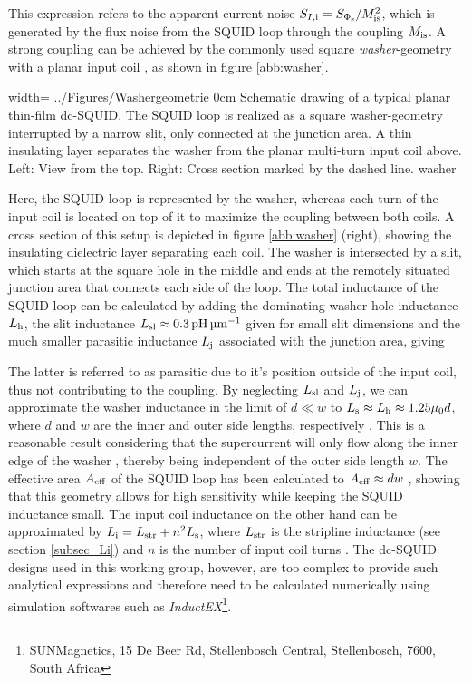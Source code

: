 
This expression refers to the apparent current noise $S_{I\rm ,i}=S_{\rm \Phi_s}/M_{\rm is}^2$, which is generated by the flux noise from the SQUID loop through the coupling $M_{\rm is}$. A strong coupling can be achieved by the commonly used square \textit{washer}-geometry with a planar input coil \cite{Jaycox1981}, as shown in figure \ref{abb:washer}. 

{width=\textwidth}
{../Figures/Washergeometrie}
{0cm}   %
{Schematic drawing of a typical planar thin-film dc-SQUID. The SQUID loop is realized as a square washer-geometry interrupted by a narrow slit, only connected at the junction area. A thin insulating layer separates the washer from the planar multi-turn input coil above. Left: View from the top. Right: Cross section marked by the dashed line.}
{washer}

Here, the SQUID loop is represented by the washer, whereas each turn of the input coil is located on top of it to maximize the coupling between both coils. A cross section of this setup is depicted in figure \ref{abb:washer} (right), showing the insulating dielectric layer separating each coil. The washer is intersected by a slit, which starts at the square hole in the middle and ends at the remotely situated junction area that connects each side of the loop. The total inductance of the SQUID loop can be calculated by adding the dominating washer hole inductance $L_{\rm h}$, the slit inductance $L_{\rm sl}\approx \qty{0.3}{\pH\per\um}$ given for small slit dimensions and the much smaller parasitic inductance $L_{\rm j}$ associated with the junction area, giving \cite{Ketchen1991}


The latter is referred to as parasitic due to it's position outside of the input coil, thus not contributing to the coupling. By neglecting $L_{\rm sl}$ and $L_{\rm j}$, we can approximate the washer inductance in the limit of $d\ll w$ to $L_{\rm s}\approx L_{\rm h}\approx 1.25{\rm\mu_0}d$, where $d$ and $w$ are the inner and outer side lengths, respectively \cite{Jaycox1981}. This is a reasonable result considering that the supercurrent will only flow along the inner edge of the washer \cite{Ketchen1982}, thereby being independent of the outer side length $w$. The effective area $A_{\rm eff}$ of the SQUID loop has been calculated to $A_{\rm eff}\approx dw$ \cite{Ketchen1985}, showing that this geometry allows for high sensitivity while keeping the SQUID inductance small. The input coil inductance on the other hand can be approximated by $L_{\rm i}=L_{\rm str}+n^2L_{\rm s}$, where $L_{\rm str}$ is the stripline inductance (see section \ref{subsec_Li}) and $n$ is the number of input coil turns \cite{Jaycox1981}. The dc-SQUID designs used in this working group, however, are too complex to provide such analytical expressions and therefore need to be calculated numerically using simulation softwares such as \textit{InductEX}\footnote{SUNMagnetics, 15 De Beer Rd, Stellenbosch Central, Stellenbosch, 7600, South Africa}. 

